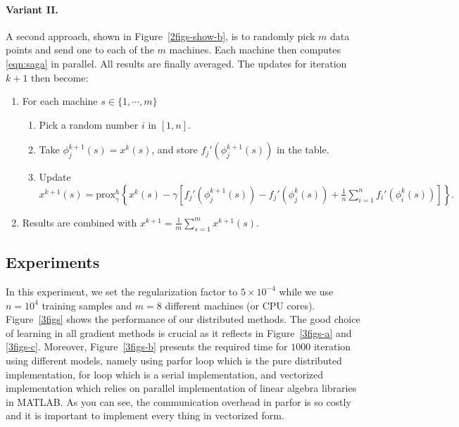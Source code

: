 \documentclass[a4paper,10pt]{article}
\newcommand{\prox}{\textrm{prox}}
\begin{document}
\paragraph{Variant II.} A second approach, shown in Figure~\ref{2figs-show-b},
is to randomly pick $m$ data points and send one to each of the $m$ machines.
Each machine then computes \eqref{eqn:saga} in parallel. All results are finally
averaged. The updates for iteration $k+1$ then become:
\begin{enumerate}	
	\item For each machine $s \in \{ 1, \cdots, m \}$
	\begin{enumerate}
		\item Pick a random number $i$ in $[1, n]$.
		\item Take $\phi_j^{k+1}(s) = x^k(s)$, and store $f_j'(\phi_j^{k+1}(s))$ in the table.
		\item Update $x^{k+1}(s) = \prox_\gamma^h \left\{ x^k(s) - \gamma \left[ f_j'(\phi_j^{k+1}(s)) - f_j'(\phi_j^k(s))
			+ \frac1n \sum_{i=1}^n f_i'(\phi_i^k(s)) \right] \right\}.$
	\end{enumerate}
	\item Results are combined with $ x^{k+1} = \frac{1}{m} \sum_{s=1}^m
		x^{k+1}(s)$.
\end{enumerate}

\subsection{Experiments}

In this experiment, we set the regularization factor to $5\times 10^{-4}$ while
we use $n=10^4$ training samples and $m=8$ different machines (or CPU cores).
Figure~\ref{3figs} shows the performance of our distributed methods. The good
choice of learning in all gradient methods is crucial as it reflects in
Figure~\ref{3figs-a} and \ref{3figs-c}. Moreover, Figure~\ref{3figs-b} presents
the required time for $1000$ iteration using different models, namely using
parfor loop which is the pure distributed implementation, for loop which is a
serial implementation, and vectorized implementation which relies on parallel
implementation of linear algebra libraries in MATLAB. As you can see, the
communication overhead in parfor is so costly and it is important to implement
every thing in vectorized form.
\end{document}

